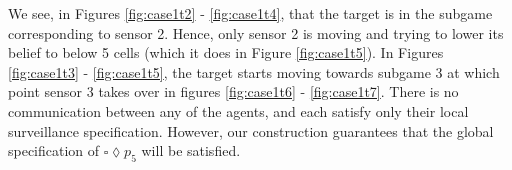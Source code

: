 We see, in Figures \ref{fig:case1t2} - \ref{fig:case1t4}, that the target is in the subgame corresponding to sensor 2. Hence, only sensor 2 is moving and trying to lower its belief to below 5 cells (which it does in Figure \ref{fig:case1t5}). In Figures \ref{fig:case1t3} - \ref{fig:case1t5}, the target starts moving towards subgame 3 at which point sensor 3 takes over in figures \ref{fig:case1t6} - \ref{fig:case1t7}. There is no communication between any of the agents, and each satisfy only their local surveillance specification. However, our construction guarantees that the global specification of $\square \lozenge p_5$ will be satisfied. %
 
